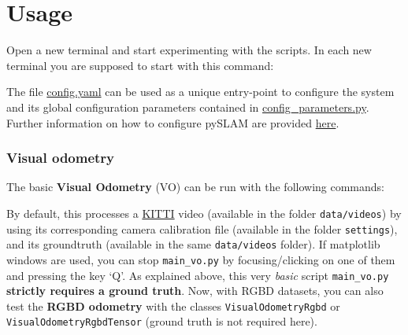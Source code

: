 \documentclass{article}
\newenvironment{Shaded}{\begin{snugshade}}{\end{snugshade}}
\newcommand{\BuiltInTok}[1]{\textcolor[rgb]{0.74,0.68,0.62}{#1}}
\newcommand{\CommentTok}[1]{\textcolor[rgb]{0.00,0.40,1.00}{\textbf{\textit{#1}}}}
\newcommand{\ExtensionTok}[1]{\textcolor[rgb]{0.74,0.68,0.62}{#1}}
\newcommand{\NormalTok}[1]{\textcolor[rgb]{0.74,0.68,0.62}{#1}}
\begin{document}
\FloatBarrier

\hypertarget{usage}{%
\section{Usage}\label{usage}}

Open a new terminal and start experimenting with the scripts. In each
new terminal you are supposed to start with this command:

\begin{scriptsize}
\begin{Shaded}
\end{Shaded}
\end{scriptsize}

The file \href{./config.yaml}{config.yaml} can be used as a unique
entry-point to configure the system and its global configuration
parameters contained in
\href{./config_parameters.py}{config\_parameters.py}. Further
information on how to configure pySLAM are provided
\protect\hyperlink{selecting-a-dataset-and-different-configuration-parameters}{here}.


\hypertarget{visual-odometry}{%
\subsubsection{Visual odometry}\label{visual-odometry}}

The basic \textbf{Visual Odometry} (VO) can be run with the following
commands:

\begin{scriptsize}
\begin{Shaded}
\end{Shaded}
\end{scriptsize}


By default, this processes a
\href{http://www.cvlibs.net/datasets/kitti/eval_odometry.php}{KITTI}
video (available in the folder \texttt{data/videos}) by using its
corresponding camera calibration file (available in the folder
\texttt{settings}), and its groundtruth (available in the same
\texttt{data/videos} folder). If matplotlib windows are used, you can
stop \texttt{main\_vo.py} by focusing/clicking on one of them and
pressing the key `Q'. As explained above, this very \emph{basic} script
\texttt{main\_vo.py} \textbf{strictly requires a ground truth}. Now,
with RGBD datasets, you can also test the \textbf{RGBD odometry} with
the classes \texttt{VisualOdometryRgbd} or
\texttt{VisualOdometryRgbdTensor} (ground truth is not required here).
\end{document}
